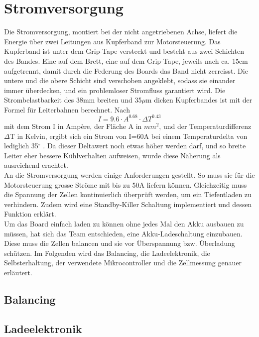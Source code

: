 \section{Stromversorgung}
\label{HW_Stromversorgung}
Die Stromversorgung, montiert bei der nicht angetriebenen Achse, liefert die Energie über zwei Leitungen aus Kupferband zur Motorsteuerung. Das Kupferband ist unter dem Grip-Tape versteckt und besteht aus zwei Schichten des Bandes. Eine auf dem Brett, eine auf dem Grip-Tape, jeweils nach ca. 15cm aufgetrennt, damit durch die Federung des Boards das Band nicht zerreisst. Die untere und die obere Schicht sind verschoben angeklebt, sodass sie einander immer überdecken, und ein problemloser Stromfluss garantiert wird. Die Strombelastbarkeit des 38mm breiten und 35$\mu$m dicken Kupferbandes ist mit der Formel für Leiterbahnen berechnet.
Nach
\begin{equation}\label{FormelStrombelastbarkeit}
I = 9.6 \cdot A^{0.68} \cdot \Delta T ^{0.43}
\end{equation}
mit dem Strom I in Ampère, der Fläche A in \(mm^2\), und der Temperaturdifferenz \(\Delta\)T in Kelvin,
ergibt sich ein Strom von I=60A bei einem Temperaturdelta von lediglich 35\(^\circ\) \cite{FormelStrombelastbarkeitLeiterbahn}. Da dieser Deltawert noch etwas höher werden darf, und so breite Leiter eher bessere Kühlverhalten aufweisen, wurde diese Näherung als ausreichend erachtet.
\\
An die Stromversorgung werden einige Anforderungen gestellt. So muss sie für die Motorsteuerung grosse Ströme mit bis zu 50A liefern können. Gleichzeitig muss die Spannung der Zellen kontinuierlich überprüft werden, um ein Tiefentladen zu verhindern. Zudem wird eine Standby-Killer Schaltung implementiert und dessen Funktion erklärt.\\
Um das Board einfach laden zu können ohne jedes Mal den Akku ausbauen zu müssen, hat sich das Team entschieden, eine Akku-Ladeschaltung einzubauen. Diese muss die Zellen balancen und sie vor Überspannung bzw. Überladung schützen. 
Im Folgenden wird das Balancing, die Ladeelektronik, die Selbsterhaltung, der verwendete Mikrocontroller und die Zellmessung genauer erläutert.
\subsection*{Balancing}


\subsection*{Ladeelektronik}


